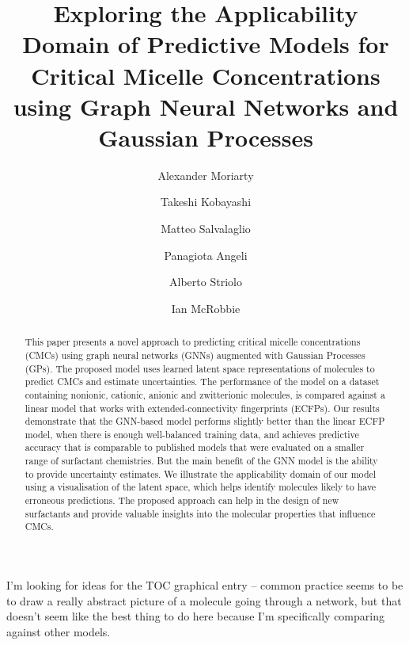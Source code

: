 \documentclass[journal=jcisd8,manuscript=article]{achemso}
\author{Alexander Moriarty}
\author{Takeshi Kobayashi}
\author{Matteo Salvalaglio}
\author{Panagiota Angeli}
\author{Alberto Striolo}
\affiliation[UCL]{Department of Chemical Engineering, University College London, UK}
\author{Ian McRobbie}
\affiliation[Innospec]{Senior Vice President, Research and Technology, Innospec Ltd., Ellesmere Port, UK}
\title{Exploring the Applicability Domain of Predictive Models for Critical Micelle Concentrations using Graph Neural Networks and Gaussian Processes}
\begin{document}
\begin{tocentry}

    I'm looking for ideas for the TOC graphical entry -- common practice seems
    to be to draw a really abstract picture of a molecule going through a
    network, but that doesn't seem like the best thing to do here because I'm
    specifically comparing against other models.

\end{tocentry}

\begin{abstract}
    This paper presents a novel approach to predicting critical micelle
    concentrations (CMCs) using graph neural networks (GNNs) augmented with
    Gaussian Processes (GPs). The proposed model uses learned latent space
    representations of molecules to predict CMCs and estimate uncertainties. The
    performance of the model on a dataset containing nonionic, cationic, anionic
    and zwitterionic molecules, is compared against a linear model that works
    with extended-connectivity fingerprints (ECFPs). Our results demonstrate
    that the GNN-based model performs slightly better than the linear ECFP
    model, when there is enough well-balanced training data, and achieves
    predictive accuracy that is comparable to published models that were
    evaluated on a smaller range of surfactant chemistries. But the main benefit
    of the GNN model is the ability to provide uncertainty estimates. We
    illustrate the applicability domain of our model using a visualisation of
    the latent space, which helps identify molecules likely to have erroneous
    predictions. The proposed approach can help in the design of new surfactants
    and provide valuable insights into the molecular properties that influence
    CMCs.
\end{abstract}

\end{document}
